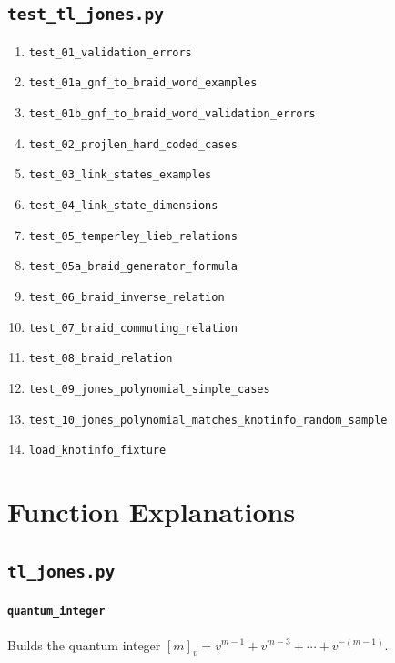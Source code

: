 ﻿\documentclass[10pt]{article}
\begin{document}
\subsection{\texttt{test\_tl\_jones.py}}
\begin{enumerate}
  \item \texttt{test\_01\_validation\_errors}
  \item \texttt{test\_01a\_gnf\_to\_braid\_word\_examples}
  \item \texttt{test\_01b\_gnf\_to\_braid\_word\_validation\_errors}
  \item \texttt{test\_02\_projlen\_hard\_coded\_cases}
  \item \texttt{test\_03\_link\_states\_examples}
  \item \texttt{test\_04\_link\_state\_dimensions}
  \item \texttt{test\_05\_temperley\_lieb\_relations}
  \item \texttt{test\_05a\_braid\_generator\_formula}
  \item \texttt{test\_06\_braid\_inverse\_relation}
  \item \texttt{test\_07\_braid\_commuting\_relation}
  \item \texttt{test\_08\_braid\_relation}
  \item \texttt{test\_09\_jones\_polynomial\_simple\_cases}
  \item \texttt{test\_10\_jones\_polynomial\_matches\_knotinfo\_random\_sample}
  \item \texttt{load\_knotinfo\_fixture}
\end{enumerate}








\newpage
\section{Function Explanations}

\subsection{\texttt{tl\_jones.py}}

\paragraph{\texttt{quantum\_integer}}
Builds the quantum integer $[m]_v = v^{m-1} + v^{m-3} + \cdots + v^{-(m-1)}$. 
\end{document}
